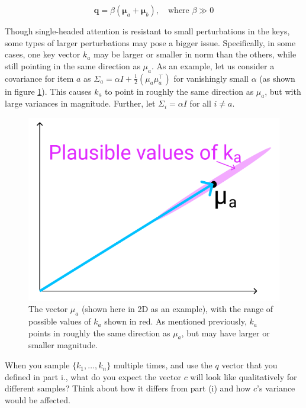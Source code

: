 \begin{parts}
\begin{subparts}
{	$$\mathbf{q}=\beta(\mathbf{\mu}_a + \mathbf{\mu}_b),\quad\text{where } \beta \gg 0$$}

\subpart[3] Though single-headed attention is resistant to small perturbations in the keys, some types of larger perturbations may pose a bigger issue. Specifically, in some cases, one key vector $k_a$ may be larger or smaller in norm than the others, while still pointing in the same direction as $\mu_a$. As an example, let us consider a covariance for item $a$ as $\Sigma_a = \alpha I + \frac{1}{2}(\mu_a\mu_a^\top)$ for vanishingly small $\alpha$ (as shown in figure \ref{ka_plausible}). This causes $k_a$ to point in roughly the same direction as $\mu_a$, but with large variances in magnitude. Further, let $\Sigma_i = \alpha I$ for all $i \neq a$. %
\begin{figure}[h]
\centering
\captionsetup{justification=centering,margin=2cm}
\includegraphics[width=0.35\linewidth]{images/ka_plausible.png}
\caption{The vector $\mu_a$ (shown here in 2D as an example), with the range of possible values of $k_a$ shown in red. As mentioned previously, $k_a$ points in roughly the same direction as $\mu_a$, but may have larger or smaller magnitude.}
\label{ka_plausible}
\end{figure}

When you sample $\{k_1,\dots,k_n\}$ multiple times, and use the $q$ vector that you defined in part i., what do you expect the vector $c$ will look like qualitatively for different samples? Think about how it differs from part (i) and how $c$'s variance would be affected.

\end{subparts}
\end{parts}
